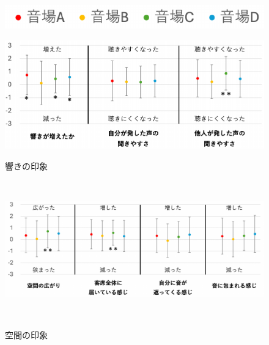 \documentclass[11pt,a4j]{jreport}
\begin{document}
  \begin{figure}[H]
    \centering
    
    \begin{minipage}{1\linewidth}
      \centering
      \includegraphics[scale=.55]{images/subjectiveExp/statisticAnalysis/legend.pdf}
      \label{fig:段階評価の凡例}
    \end{minipage}

    \vspace{1\baselineskip}

    \begin{minipage}{1\linewidth}
      \centering
      \includegraphics[scale=.55]{images/subjectiveExp/statisticAnalysis/01reverb_a.pdf}
      \caption*{響きの印象}
      \label{fig:響きの印象}
    \end{minipage}
    \\
    \vspace{1\baselineskip}
    \begin{minipage}{1\linewidth}
      \centering
      \includegraphics[scale=.55]{images/subjectiveExp/statisticAnalysis/02space_a.pdf}
      \caption*{空間の印象}
      \label{fig:空間の印象}
    \end{minipage}
    \\
    \vspace{1\baselineskip}

\end{figure}
\end{document}
